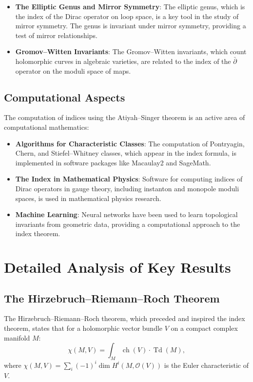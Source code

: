 \begin{itemize}
\item \textbf{The Elliptic Genus and Mirror Symmetry}: The elliptic genus, which is the index of the Dirac operator on loop space, is a key tool in the study of mirror symmetry. The genus is invariant under mirror symmetry, providing a test of mirror relationships.

\item \textbf{Gromov--Witten Invariants}: The Gromov--Witten invariants, which count holomorphic curves in algebraic varieties, are related to the index of the $\bar\partial$ operator on the moduli space of maps.
\end{itemize}

\subsection{Computational Aspects}

The computation of indices using the Atiyah--Singer theorem is an active area of computational mathematics:

\begin{itemize}
\item \textbf{Algorithms for Characteristic Classes}: The computation of Pontryagin, Chern, and Stiefel--Whitney classes, which appear in the index formula, is implemented in software packages like Macaulay2 and SageMath.

\item \textbf{The Index in Mathematical Physics}: Software for computing indices of Dirac operators in gauge theory, including instanton and monopole moduli spaces, is used in mathematical physics research.

\item \textbf{Machine Learning}: Neural networks have been used to learn topological invariants from geometric data, providing a computational approach to the index theorem.
\end{itemize}

\section{Detailed Analysis of Key Results}

\subsection{The Hirzebruch--Riemann--Roch Theorem}

The Hirzebruch--Riemann--Roch theorem, which preceded and inspired the index theorem, states that for a holomorphic vector bundle $V$ on a compact complex manifold $M$:
\[
\chi(M, V) = \int_M \operatorname{ch}(V) \cdot \operatorname{Td}(M),
\]
where $\chi(M, V) = \sum_i (-1)^i \dim H^i(M, \mathcal{O}(V))$ is the Euler characteristic of $V$.

